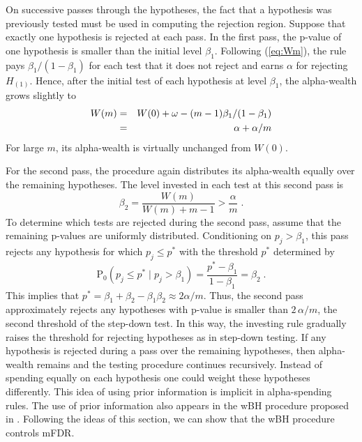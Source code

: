 \documentclass[12pt]{article}
\newcommand{\pr}{\mbox{P}}
\newcommand{\al}{\alpha}
\newcommand{\eqn}[1]{(\ref{#1})}
\newcommand{\given}{\; \big| \;}
\begin{document}
 On successive passes through the hypotheses, the
 fact that a hypothesis was previously tested must be used in
 computing the rejection region.  Suppose that
 exactly one hypothesis is rejected at each pass.  In the first pass, 
  the p-value of one hypothesis is smaller than the initial level $\beta_{1}$.
  Following \eqn{eq:Wm}, the rule pays $\beta_{1}/(1-\beta_{1})$ for
 each test that it does not reject and earns $\al$ for rejecting
 $H_{(1)}$.  Hence, after the initial test of each hypothesis at level
 $\beta_{1}$, the alpha-wealth grows slightly to
\begin{eqnarray}
 W(m) 
   &=& W(0) + \omega - (m-1) \beta_{1}/(1-\beta_{1})      \cr
   &=& \alpha + \al/m               
\label{eq:approx}
\end{eqnarray}
For large $m$, its alpha-wealth is virtually unchanged from $W(0)$.

For the second pass, the procedure again distributes
 its alpha-wealth equally over the remaining hypotheses.  
 The level invested in each test at this second pass is
\begin{displaymath}
  \beta_2 = \frac{W(m)}{W(m)+m-1} > \frac{\al}{m} \;.
\end{displaymath}
To determine which tests are rejected during the second pass, assume that
 the remaining p-values are uniformly distributed.  Conditioning on
 $p_j > \beta_1$, this pass rejects any hypothesis for which $p_j \le
 p^{*}$ with the threshold $p^{*}$ determined by
\begin{displaymath}
  \pr_0\left(
   p_j \le p^{*} \given p_j > \beta_1 
    \right) =  \frac{p^{*} - \beta_1}{1-\beta_1} = \beta_2 \;.
\end{displaymath}
This implies that $p^{*} = \beta_1+\beta_2 - \beta_1\beta_2 \approx 2
 \al/m$. Thus, the second pass approximately rejects any hypotheses
 with p-value is smaller than $2\,\al/m$, the second threshold of the
 step-down test.  In this way, the investing rule gradually raises the
 threshold for rejecting hypotheses as in step-down testing.  If any
 hypothesis is rejected during a pass over the remaining hypotheses,
 then alpha-wealth remains and the testing procedure continues
 recursively. Instead of spending equally on each hypothesis one could
 weight these hypotheses differently.  This idea of using prior
 information is implicit in alpha-spending rules. The use of prior
 information also appears in the wBH procedure proposed in
 \cite{wasserman06}.  Following the ideas of this section, we can show
 that the wBH procedure controls mFDR.
\end{document}
